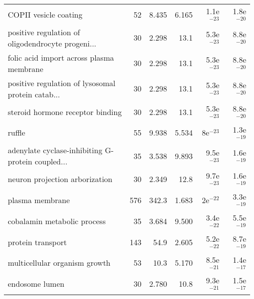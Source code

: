 \begin{longtable}{lrrrrr}
                             COPII vesicle coating &                      52 &                   8.435 &      6.165 &         1.1e$^{-23}$ &         1.8e$^{-20}$ \\
 positive regulation of oligodendrocyte progeni... &                      30 &                   2.298 &       13.1 &         5.3e$^{-23}$ &         8.8e$^{-20}$ \\
          folic acid import across plasma membrane &                      30 &                   2.298 &       13.1 &         5.3e$^{-23}$ &         8.8e$^{-20}$ \\
 positive regulation of lysosomal protein catab... &                      30 &                   2.298 &       13.1 &         5.3e$^{-23}$ &         8.8e$^{-20}$ \\
                  steroid hormone receptor binding &                      30 &                   2.298 &       13.1 &         5.3e$^{-23}$ &         8.8e$^{-20}$ \\
                                            ruffle &                      55 &                   9.938 &      5.534 &           8e$^{-23}$ &         1.3e$^{-19}$ \\
 adenylate cyclase-inhibiting G-protein coupled... &                      35 &                   3.538 &      9.893 &         9.5e$^{-23}$ &         1.6e$^{-19}$ \\
                    neuron projection arborization &                      30 &                   2.349 &       12.8 &         9.7e$^{-23}$ &         1.6e$^{-19}$ \\
                                   plasma membrane &                     576 &                   342.3 &      1.683 &           2e$^{-22}$ &         3.3e$^{-19}$ \\
                       cobalamin metabolic process &                      35 &                   3.684 &      9.500 &         3.4e$^{-22}$ &         5.5e$^{-19}$ \\
                                 protein transport &                     143 &                    54.9 &      2.605 &         5.2e$^{-22}$ &         8.7e$^{-19}$ \\
                     multicellular organism growth &                      53 &                    10.3 &      5.170 &         8.5e$^{-21}$ &         1.4e$^{-17}$ \\
                                    endosome lumen &                      30 &                   2.780 &       10.8 &         9.3e$^{-21}$ &         1.5e$^{-17}$ \\

\end{longtable}
